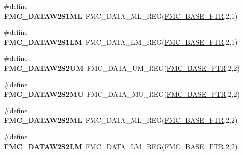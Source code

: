\begin{DoxyCompactItemize}
\item 
\hypertarget{group___f_m_c___register___accessor___macros_ga7232e0d5ce643cf3799de8f453b300c1}{}\#define {\bfseries F\+M\+C\+\_\+\+D\+A\+T\+A\+W2\+S1\+M\+L}~F\+M\+C\+\_\+\+D\+A\+T\+A\+\_\+\+M\+L\+\_\+\+R\+E\+G(\hyperlink{group___f_m_c___peripheral_ga0a740437b573e32e6b932bf729485fd9}{F\+M\+C\+\_\+\+B\+A\+S\+E\+\_\+\+P\+T\+R},2,1)\label{group___f_m_c___register___accessor___macros_ga7232e0d5ce643cf3799de8f453b300c1}

\item 
\hypertarget{group___f_m_c___register___accessor___macros_gacd3f28b51db26e47c51a98330ab0118e}{}\#define {\bfseries F\+M\+C\+\_\+\+D\+A\+T\+A\+W2\+S1\+L\+M}~F\+M\+C\+\_\+\+D\+A\+T\+A\+\_\+\+L\+M\+\_\+\+R\+E\+G(\hyperlink{group___f_m_c___peripheral_ga0a740437b573e32e6b932bf729485fd9}{F\+M\+C\+\_\+\+B\+A\+S\+E\+\_\+\+P\+T\+R},2,1)\label{group___f_m_c___register___accessor___macros_gacd3f28b51db26e47c51a98330ab0118e}

\item 
\hypertarget{group___f_m_c___register___accessor___macros_ga8c409df9e8dc7e296c2bb90ba9b37049}{}\#define {\bfseries F\+M\+C\+\_\+\+D\+A\+T\+A\+W2\+S2\+U\+M}~F\+M\+C\+\_\+\+D\+A\+T\+A\+\_\+\+U\+M\+\_\+\+R\+E\+G(\hyperlink{group___f_m_c___peripheral_ga0a740437b573e32e6b932bf729485fd9}{F\+M\+C\+\_\+\+B\+A\+S\+E\+\_\+\+P\+T\+R},2,2)\label{group___f_m_c___register___accessor___macros_ga8c409df9e8dc7e296c2bb90ba9b37049}

\item 
\hypertarget{group___f_m_c___register___accessor___macros_gafa1f8178724b92b6ba74284f8675da63}{}\#define {\bfseries F\+M\+C\+\_\+\+D\+A\+T\+A\+W2\+S2\+M\+U}~F\+M\+C\+\_\+\+D\+A\+T\+A\+\_\+\+M\+U\+\_\+\+R\+E\+G(\hyperlink{group___f_m_c___peripheral_ga0a740437b573e32e6b932bf729485fd9}{F\+M\+C\+\_\+\+B\+A\+S\+E\+\_\+\+P\+T\+R},2,2)\label{group___f_m_c___register___accessor___macros_gafa1f8178724b92b6ba74284f8675da63}

\item 
\hypertarget{group___f_m_c___register___accessor___macros_ga0bee9be9fa12dd8eebe7bf1f0f4b0345}{}\#define {\bfseries F\+M\+C\+\_\+\+D\+A\+T\+A\+W2\+S2\+M\+L}~F\+M\+C\+\_\+\+D\+A\+T\+A\+\_\+\+M\+L\+\_\+\+R\+E\+G(\hyperlink{group___f_m_c___peripheral_ga0a740437b573e32e6b932bf729485fd9}{F\+M\+C\+\_\+\+B\+A\+S\+E\+\_\+\+P\+T\+R},2,2)\label{group___f_m_c___register___accessor___macros_ga0bee9be9fa12dd8eebe7bf1f0f4b0345}

\item 
\hypertarget{group___f_m_c___register___accessor___macros_ga0321b5572ca7428ee69b3d7b51c8123f}{}\#define {\bfseries F\+M\+C\+\_\+\+D\+A\+T\+A\+W2\+S2\+L\+M}~F\+M\+C\+\_\+\+D\+A\+T\+A\+\_\+\+L\+M\+\_\+\+R\+E\+G(\hyperlink{group___f_m_c___peripheral_ga0a740437b573e32e6b932bf729485fd9}{F\+M\+C\+\_\+\+B\+A\+S\+E\+\_\+\+P\+T\+R},2,2)\label{group___f_m_c___register___accessor___macros_ga0321b5572ca7428ee69b3d7b51c8123f}


\end{DoxyCompactItemize}
